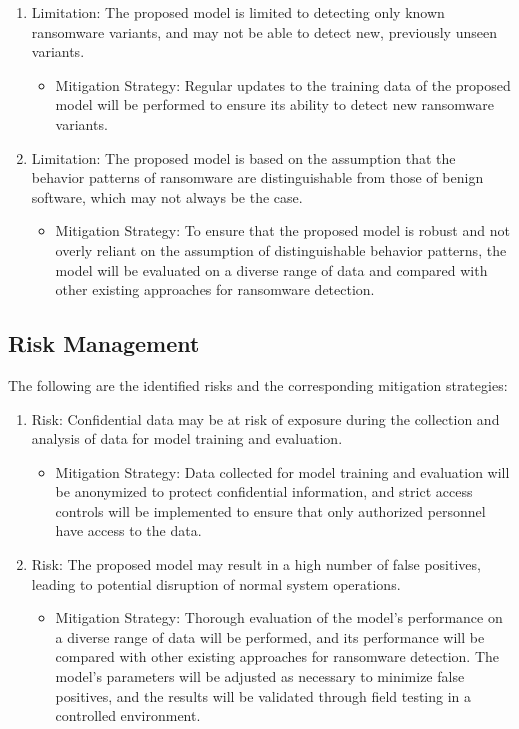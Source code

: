 \documentclass[12pt,a4paper,twoside]{article}
\begin{document}
\begin{enumerate}
\item Limitation: The proposed model is limited to detecting only known ransomware variants, and may not be able to detect new, previously unseen variants.
\begin{itemize}
\item Mitigation Strategy: Regular updates to the training data of the proposed model will be performed to ensure its ability to detect new ransomware variants.
\end{itemize}
\item Limitation: The proposed model is based on the assumption that the behavior patterns of ransomware are distinguishable from those of benign software, which may not always be the case.
\begin{itemize}
    \item Mitigation Strategy: To ensure that the proposed model is robust and not overly reliant on the assumption of distinguishable behavior patterns, the model will be evaluated on a diverse range of data and compared with other existing approaches for ransomware detection.
\end{itemize}
\end{enumerate}



\subsection{Risk Management}

The following are the identified risks and the corresponding mitigation strategies:

\begin{enumerate}
\item Risk: Confidential data may be at risk of exposure during the collection and analysis of data for model training and evaluation.
\begin{itemize}
\item Mitigation Strategy: Data collected for model training and evaluation will be anonymized to protect confidential information, and strict access controls will be implemented to ensure that only authorized personnel have access to the data.
\end{itemize}
\item Risk: The proposed model may result in a high number of false positives, leading to potential disruption of normal system operations.
\begin{itemize}
    \item Mitigation Strategy: Thorough evaluation of the model's performance on a diverse range of data will be performed, and its performance will be compared with other existing approaches for ransomware detection. The model's parameters will be adjusted as necessary to minimize false positives, and the results will be validated through field testing in a controlled environment. 
\end{itemize}
\end{enumerate}
\end{document}
